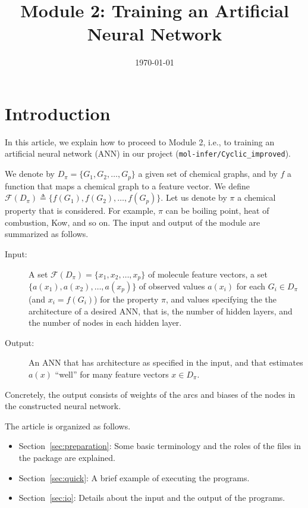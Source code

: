 \documentclass[11pt, titlepage, dvipdfmx, twoside]{article}
\title{\huge Module 2:
Training an Artificial Neural Network}
\author{\project}
\newcommand{\project}{{\tt mol-infer/Cyclic\_improved}}
\newcommand{\secref}[1]{Section~\ref{sec:#1}}
\begin{document}
\makeatletter 
\let\c@lstlisting\c@figure
\makeatother
\date{\today}
\maketitle
\thispagestyle{empty}
\tableofcontents
\clearpage
{}


\section{Introduction}
In this article,
we explain how to proceed to  Module 2, 
i.e., to training an artificial neural network (ANN)
in our project (\project).

We denote by $D_\pi=\{G_1,G_2,\dots,G_p\}$ a given set of chemical graphs,
and by $f$ a function that maps a chemical graph to a feature vector.
We define ${\mathcal F}(D_\pi)\triangleq\{f(G_1),f(G_2),\dots,f(G_p)\}$. 
Let us denote by $\pi$ a chemical property that is considered.
For example, $\pi$ can be boiling point, heat of combustion, Kow, and so on. 
The input and output of the module are summarized as follows.

\begin{oframed}
\begin{description}
\item[Input:] 
A set ${\mathcal F}(D_\pi)=\{x_1, x_2,\dots, x_p\}$ of molecule feature vectors,
  a set $\{a(x_1), a(x_2), \dots, a(x_p)\}$ of observed values $a(x_i)$ for 
  each $G_i\in D_\pi$ (and $x_i=f(G_i)$)
  for the property $\pi$,
  and values specifying the the architecture of a desired  ANN,
  that is, the number of hidden layers, 
  and the number of nodes in each hidden layer. 
\item[Output:] 
An ANN that
  has architecture as specified in the input,
  and that estimates $a(x)$ ``well'' for many feature vectors $x \in D_\pi$. 
\end{description}
\end{oframed}
%
Concretely, the output consists of weights of the arcs
and biases of the nodes in the constructed neural network. 

The article is organized as follows. 
\begin{itemize}
\item \secref{preparation}: 
Some basic terminology and the roles of the files in the package are explained. 
%
\item \secref{quick}: 
A brief example of executing the programs. 
%
\item \secref{io}: Details about the input and the output of the programs. 
\end{itemize}
\end{document}
